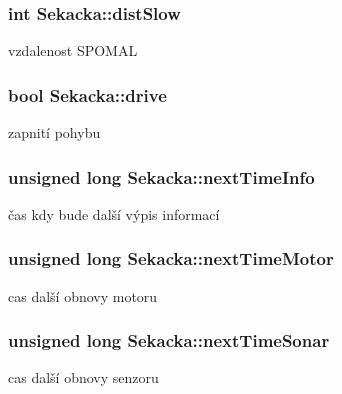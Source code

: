 \subsubsection[{\texorpdfstring{dist\+Slow}{distSlow}}]{\setlength{\rightskip}{0pt plus 5cm}int Sekacka\+::dist\+Slow\hspace{0.3cm}{\ttfamily [private]}}\hypertarget{class_sekacka_a129f7eb9e4d1476fcc40ed610604132a}{}\label{class_sekacka_a129f7eb9e4d1476fcc40ed610604132a}
vzdalenost S\+P\+O\+M\+AL 
\subsubsection[{\texorpdfstring{drive}{drive}}]{\setlength{\rightskip}{0pt plus 5cm}bool Sekacka\+::drive\hspace{0.3cm}{\ttfamily [private]}}\hypertarget{class_sekacka_aa135507dbc52a6c2dd6e9f6ff2457b36}{}\label{class_sekacka_aa135507dbc52a6c2dd6e9f6ff2457b36}
zapnití pohybu 
\subsubsection[{\texorpdfstring{next\+Time\+Info}{nextTimeInfo}}]{\setlength{\rightskip}{0pt plus 5cm}unsigned long Sekacka\+::next\+Time\+Info\hspace{0.3cm}{\ttfamily [private]}}\hypertarget{class_sekacka_ad1a2be8445580ee6da05f49c0d7905e9}{}\label{class_sekacka_ad1a2be8445580ee6da05f49c0d7905e9}
čas kdy bude další výpis informací 
\subsubsection[{\texorpdfstring{next\+Time\+Motor}{nextTimeMotor}}]{\setlength{\rightskip}{0pt plus 5cm}unsigned long Sekacka\+::next\+Time\+Motor\hspace{0.3cm}{\ttfamily [private]}}\hypertarget{class_sekacka_a3d40897d033fe36d1644520562a3c497}{}\label{class_sekacka_a3d40897d033fe36d1644520562a3c497}
cas další obnovy motoru 
\subsubsection[{\texorpdfstring{next\+Time\+Sonar}{nextTimeSonar}}]{\setlength{\rightskip}{0pt plus 5cm}unsigned long Sekacka\+::next\+Time\+Sonar\hspace{0.3cm}{\ttfamily [private]}}\hypertarget{class_sekacka_a0ef81f7686a22c5f4e7fa004dfa14930}{}\label{class_sekacka_a0ef81f7686a22c5f4e7fa004dfa14930}
cas další obnovy senzoru 
